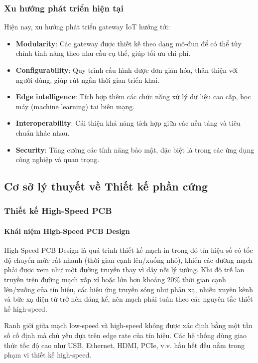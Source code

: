         \subsubsection{Xu hướng phát triển hiện tại}
            Hiện nay, xu hướng phát triển gateway IoT hướng tới:
            \begin{itemize}
                \item \textbf{Modularity}: Các gateway được thiết kế theo dạng mô-đun để có thể tùy chỉnh tính năng theo nhu cầu cụ thể, giúp tối ưu chi phí.
                \item \textbf{Configurability}: Quy trình cấu hình được đơn giản hóa, thân thiện với người dùng, giúp rút ngắn thời gian triển khai.
                \item \textbf{Edge intelligence}: Tích hợp thêm các chức năng xử lý dữ liệu cao cấp, học máy (machine learning) tại biên mạng.
                \item \textbf{Interoperability}: Cải thiện khả năng tích hợp giữa các nền tảng và tiêu chuẩn khác nhau.
                \item \textbf{Security}: Tăng cường các tính năng bảo mật, đặc biệt là trong các ứng dụng công nghiệp và quan trọng.
            \end{itemize}
        \subsection{Cơ sở lý thuyết về Thiết kế phần cứng}
            \subsubsection{Thiết kế High-Speed PCB}
                \paragraph{Khái niệm High-Speed PCB Design}
                    High-Speed PCB Design là quá trình thiết kế mạch in trong đó tín hiệu số có tốc độ chuyển mức rất nhanh (thời gian cạnh lên/xuống nhỏ), khiến các đường mạch phải được xem như một đường truyền thay vì dây nối lý tưởng. Khi độ trễ lan truyền trên đường mạch xấp xỉ hoặc lớn hơn khoảng 20\% thời gian cạnh lên/xuống của tín hiệu, các hiệu ứng truyền sóng như phản xạ, nhiễu xuyên kênh và bức xạ điện từ trở nên đáng kể, nên mạch phải tuân theo các nguyên tắc thiết kế high-speed\cite{bogatin2010signal}.
                    
                    Ranh giới giữa mạch low-speed và high-speed không được xác định bằng một tần số cố định mà chủ yếu dựa trên edge rate của tín hiệu. Các hệ thống dùng giao thức tốc độ cao như USB, Ethernet, HDMI, PCIe, v.v. hầu hết đều nằm trong phạm vi thiết kế high-speed.
                    
